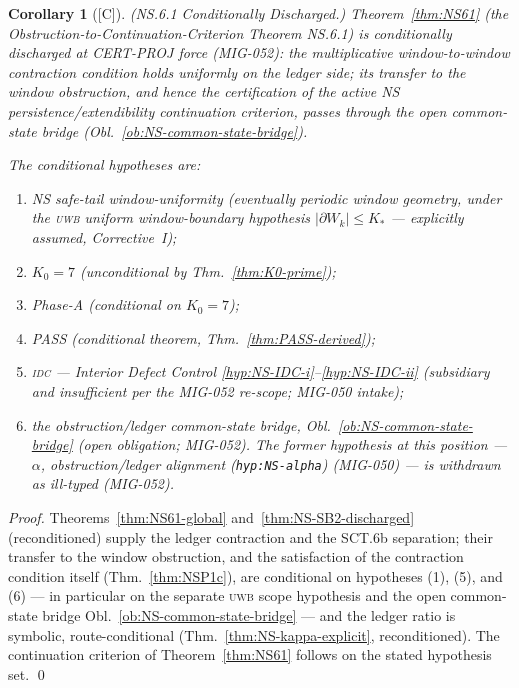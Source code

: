 \documentclass[12pt,oneside]{amsbook}
\theoremstyle{plain}
\newtheorem{corollary}[theorem]{Corollary}
\theoremstyle{definition}
\theoremstyle{remark}
\newcommand{\status}[1]{\textup{[#1]}}
\begin{document}
\begin{corollary}[\status{C}]\label{cor:NS61-discharged}
\textup{(NS.6.1 Conditionally Discharged.)}
Theorem~\ref{thm:NS61} (the Obstruction-to-Continuation-Criterion
Theorem NS.6.1) is conditionally discharged \emph{at CERT-PROJ
force} (MIG-052): the multiplicative window-to-window contraction
condition holds uniformly \emph{on the ledger side}; its transfer
to the window obstruction, and hence the certification of the
active NS persistence/extendibility continuation criterion, passes
through the open common-state bridge
(Obl.~\ref{ob:NS-common-state-bridge}).

The conditional hypotheses are:
\begin{enumerate}[label=\textup{(\arabic*)}]
 \item NS safe-tail window-uniformity (eventually periodic
 window geometry, under the \textsc{uwb} uniform
 window-boundary hypothesis $|\partial W_k| \leq K_*$ ---
 explicitly assumed, Corrective~I);
 \item $K_0=7$ (unconditional by Thm.~\ref{thm:K0-prime});
 \item Phase-A (conditional on $K_0=7$);
 \item PASS (conditional theorem, Thm.~\ref{thm:PASS-derived});
 \item \textsc{idc} --- Interior Defect Control
 \eqref{hyp:NS-IDC-i}--\eqref{hyp:NS-IDC-ii} (subsidiary and
 insufficient per the MIG-052 re-scope; MIG-050 intake);
 \item the obstruction/ledger common-state bridge,
 Obl.~\ref{ob:NS-common-state-bridge} (open obligation; MIG-052).
 The former hypothesis at this position --- $\alpha$,
 obstruction/ledger alignment (\texttt{hyp:NS-alpha}) (MIG-050) ---
 is withdrawn as ill-typed (MIG-052).
\end{enumerate}
\end{corollary}

\begin{proof}
Theorems~\ref{thm:NS61-global} and~\ref{thm:NS-SB2-discharged}
(reconditioned) supply the ledger contraction and the SCT.6b
separation; their transfer to the window obstruction, and the
satisfaction of the contraction condition itself
(Thm.~\ref{thm:NSP1c}), are conditional on hypotheses (1), (5), and
(6) --- in particular on the separate \textsc{uwb} scope hypothesis
and the open common-state bridge
Obl.~\ref{ob:NS-common-state-bridge} --- and the ledger ratio is
symbolic, route-conditional (Thm.~\ref{thm:NS-kappa-explicit},
reconditioned). The continuation criterion of
Theorem~\ref{thm:NS61} follows on the stated hypothesis set. \qed
\end{proof}
\end{document}
